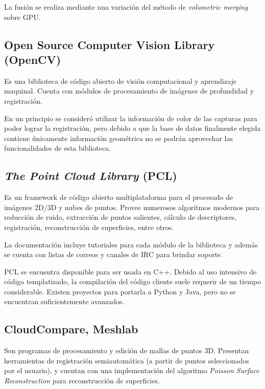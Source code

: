 	La fusión se realiza mediante una variación del método de
	\emph{volumetric merging} sobre GPU\cite{Izadi:2011:KRR:2047196.2047270}.





	\subsection{Open Source Computer Vision Library (OpenCV)}
	Es una biblioteca de código abierto de visión computacional y aprendizaje
	maquinal.  Cuenta con módulos de procesamiento de imágenes de profundidad y
	registración.

	En un principio se consideró utilizar la información de color de las capturas
	para poder lograr la registración, pero debido a que la base de datos
	finalmente elegida contiene únicamente información geométrica
	no se podrán aprovechar las funcionalidades de esta biblioteca.

	\subsection{\emph{The Point Cloud Library} (PCL)}
	Es un framework de código abierto multiplataforma para el procesado de
	imágenes 2D/3D y nubes de puntos.
	Provee numerosos algoritmos modernos para reducción de ruido, extracción de
	puntos salientes, cálculo de descriptores, registración, reconstrucción de
	superficies, entre otros.

	La documentación incluye tutoriales para cada módulo de la biblioteca y
	además se cuenta con listas de correos y canales de IRC para brindar
	soporte.

	PCL se encuentra disponible para ser usada en C++.
	Debido al uso intensivo de código templatizado, la compilación del
	código cliente suele requerir de un tiempo considerable.
	Existen proyectos para portarla a Python y Java, pero no se encuentran
	suficientemente avanzados.

	\subsection{CloudCompare, Meshlab}
	Son programas de procesamiento y edición de mallas de puntos 3D.  Presentan
	herramientas de registración semiautomática (a partir de puntos
	seleccionados por el usuario), y cuentan con una implementación del
	algoritmo \emph{Poisson Surface Reconstruction} para reconstrucción de
	superficies.

